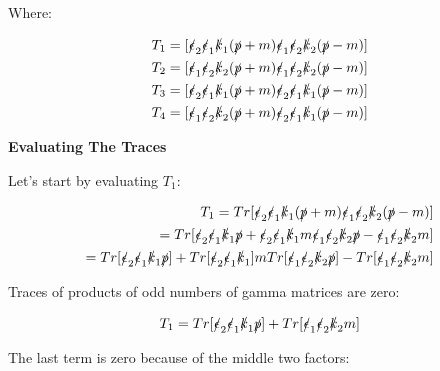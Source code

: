 \documentclass[a4]{article}
\begin{document}
    Where: 

    \begin{eqnarray}
        T_1 = [\slashed{\epsilon}_2 \slashed{\epsilon}_1 \slashed{k}_1 (\slashed{p} + m) \slashed{\epsilon}_1 \slashed{\epsilon}_2 \slashed{k}_2 (\slashed{p} - m)] \\
        T_2 = [\slashed{\epsilon}_1 \slashed{\epsilon}_2 \slashed{k}_2 (\slashed{p} + m) \slashed{\epsilon}_1 \slashed{\epsilon}_2 \slashed{k}_2 (\slashed{p} - m)] \\
        T_3 = [\slashed{\epsilon}_2 \slashed{\epsilon}_1 \slashed{k}_1 (\slashed{p} + m) \slashed{\epsilon}_2 \slashed{\epsilon}_1 \slashed{k}_1 (\slashed{p} - m)] \\
        T_4 = [\slashed{\epsilon}_1 \slashed{\epsilon}_2 \slashed{k}_2 (\slashed{p} + m) \slashed{\epsilon}_2 \slashed{\epsilon}_1 \slashed{k}_1 (\slashed{p} - m)] \\
    \end{eqnarray}

    \textbf{Evaluating The Traces}

    Let's start by evaluating $T_1$:

    \begin{eqnarray}
        T_1 = Tr [\slashed{\epsilon}_2 \slashed{\epsilon}_1 \slashed{k}_1 (\slashed{p} + m) \slashed{\epsilon}_1 \slashed{\epsilon}_2 \slashed{k}_2 (\slashed{p} - m)] \\
        = Tr [\slashed{\epsilon}_2 \slashed{\epsilon}_1 \slashed{k}_1 \slashed{p} + \slashed{\epsilon}_2 \slashed{\epsilon}_1 \slashed{k}_1 m \slashed{\epsilon}_1 \slashed{\epsilon}_2 \slashed{k}_2 \slashed{p} - \slashed{\epsilon}_1 \slashed{\epsilon}_2 \slashed{k}_2 m] \\
        = Tr [\slashed{\epsilon}_2 \slashed{\epsilon}_1 \slashed{k}_1 \slashed{p}] + Tr [\slashed{\epsilon}_2 \slashed{\epsilon}_1 \slashed{k}_1] m Tr [\slashed{\epsilon}_1 \slashed{\epsilon}_2 \slashed{k}_2 \slashed{p}] - Tr[\slashed{\epsilon}_1 \slashed{\epsilon}_2 \slashed{k}_2 m]
    \end{eqnarray}

    Traces of products of odd numbers of gamma matrices are zero:

    \begin{equation}
        T_1 = Tr [\slashed{\epsilon}_2 \slashed{\epsilon}_1 \slashed{k}_1 \slashed{p}] + Tr[\slashed{\epsilon}_1 \slashed{\epsilon}_2 \slashed{k}_2 m]
    \end{equation}

    The last term is zero because of the middle two factors:
\end{document}
